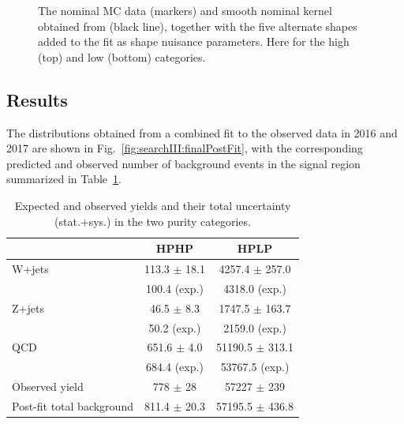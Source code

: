 \begin{figure}[h!]
\caption{The nominal MC data (markers) and smooth nominal kernel obtained from  (black line), together with the five alternate shapes added to the fit as shape nuisance parameters. Here for the high (top) and low (bottom) categories.}
\label{fig:searchIII:sys}
\end{figure}
\clearpage

\subsection{Results}
The distributions obtained from a combined fit to the observed data in 2016 and 2017 are shown in Fig.~\ref{fig:searchIII:finalPostFit}, with the corresponding predicted and observed number of background events in the signal region summarized in Table~\ref{tab:searchIII:ObsEvents}.
\begin{table}[b]

\centering
\begin{tabular}{lcc} 
 & HPHP & HPLP\\
 \hline
 \hline
W+jets & 113.3 $\pm$ 18.1 & 4257.4 $\pm$ 257.0 \\
            & 100.4 (exp.) & 4318.0 (exp.)\\
Z+jets & 46.5 $\pm$ 8.3 & 1747.5 $\pm$ 163.7\\
           & 50.2 (exp.) & 2159.0 (exp.) \\
QCD  & 651.6 $\pm$ 4.0 & 51190.5 $\pm$ 313.1 \\
          & 684.4 (exp.) & 53767.5 (exp.) \\
\hline
Observed yield & 778 $\pm$ 28 & 57227 $\pm$ 239\\
Post-fit total background & 811.4 $\pm$ 20.3 & 57195.5 $\pm$ 436.8\\
\hline
\hline

\end{tabular} 
\caption{Expected and observed yields and their total uncertainty (stat.+sys.) in the two purity categories.} 
\label{tab:searchIII:ObsEvents}
\end{table}

